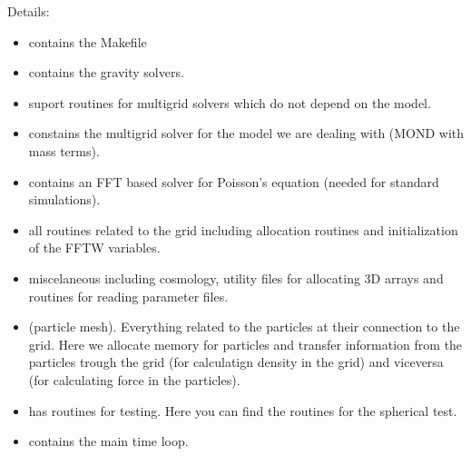 \documentclass[letterpaper,10pt,english]{sphinxmanual}
\begin{document}
Details:
\begin{itemize}
\item {} 
 contains the Makefile

\item {} 
 contains the gravity solvers.

\item {} 
 suport routines for multigrid solvers which do not depend on the model.

\item {} 
 constains the multigrid solver for the model we are dealing with (MOND with mass terms).

\item {} 
 contains an FFT based solver for Poisson’s equation (needed for standard simulations).

\item {} 
 all routines related to the grid including allocation routines and initialization of the FFTW variables.

\item {} 
 miscelaneous including cosmology, utility files for allocating 3D arrays and routines for reading parameter files.

\item {} 
 (particle mesh).  Everything related to the particles at their connection to the grid.  Here we allocate memory for particles and transfer information from the particles trough the grid (for calculatign density in the grid) and viceversa (for calculating force in the particles).

\item {} 
 has routines for testing.  Here you can find the routines for the spherical test.

\item {} 
 contains the main time loop.

\end{itemize}
\end{document}

